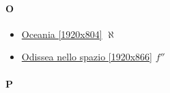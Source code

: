 	
	\paragraph{O} \hypertarget{FIO}{}
		\begin{itemize}
			
			\item \href{https://mega.nz/#!CGgBWaTY!9vrjKex0rhVh-q1dDU_dHvlFb90F6hauAstlzoO_WDk} {Oceania [1920x804]}  $\aleph$ \\ 
			\item \href{https://mega.nz/#!jex30TSa!d-mDxpAUev9aF-OiltPqMzPVwM4krVfgVBb1o5t1YDA} {Odissea nello spazio [1920x866]}  $f''$ \\ 
						
		\end{itemize}
		
	\paragraph{P} \hypertarget{FIP}{}
